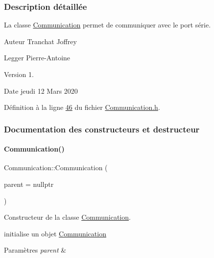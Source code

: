 \subsubsection{Description détaillée}
La classe \hyperlink{class_communication}{Communication} permet de communiquer avec le port série. 

\begin{DoxyAuthor}{Auteur}
Tranchat Joffrey 

Legger Pierre-\/\+Antoine
\end{DoxyAuthor}
\begin{DoxyVersion}{Version}
1.
\end{DoxyVersion}
\begin{DoxyDate}{Date}
jeudi 12 Mars 2020 
\end{DoxyDate}


Définition à la ligne \hyperlink{_communication_8h_source_l00046}{46} du fichier \hyperlink{_communication_8h_source}{Communication.\+h}.



\subsubsection{Documentation des constructeurs et destructeur}
\mbox{\label{class_communication_a56cf4b262e592bcae1d987c3dd00487f}} 
\paragraph{\texorpdfstring{Communication()}{Communication()}}
{\footnotesize\ttfamily Communication\+::\+Communication (\begin{DoxyParamCaption}\item[{\hyperlink{class_q_object}{Q\+Object} $\ast$}]{parent = {\ttfamily nullptr} }\end{DoxyParamCaption})}



Constructeur de la classe \hyperlink{class_communication}{Communication}. 

initialise un objet \hyperlink{class_communication}{Communication} 
\begin{DoxyParams}{Paramètres}
{\em parent} & \\
\hline
\end{DoxyParams}


